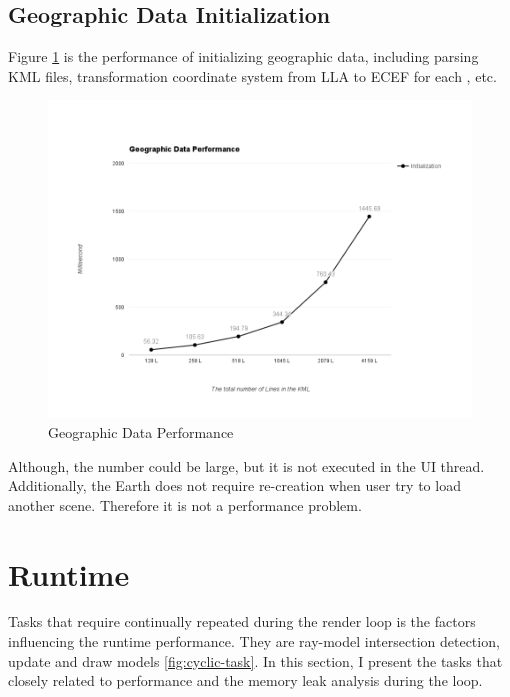 \subsection{Geographic Data Initialization}

Figure \ref{fig:geographic-data-performance} is the performance of initializing geographic data, including parsing KML files, transformation coordinate system from LLA to ECEF for each , etc.

\begin{figure}[H]
	\caption{Geographic Data Performance}
	\label{fig:geographic-data-performance}
	\centering
	\includegraphics[width=\textwidth, keepaspectratio]{Figures/geographic-data-performance.png}
	\decoRule
\end{figure}

Although, the number could be large, but it is not executed in the UI thread. Additionally, the Earth does not require re-creation when user try to load another scene. Therefore it is not a performance problem.

\section{Runtime}

Tasks that require continually repeated during the render loop is the factors influencing the runtime performance. They are ray-model intersection detection, update and draw models \ref{fig:cyclic-task}. In this section, I present the tasks that closely related to performance and the memory leak analysis during the loop.
 
